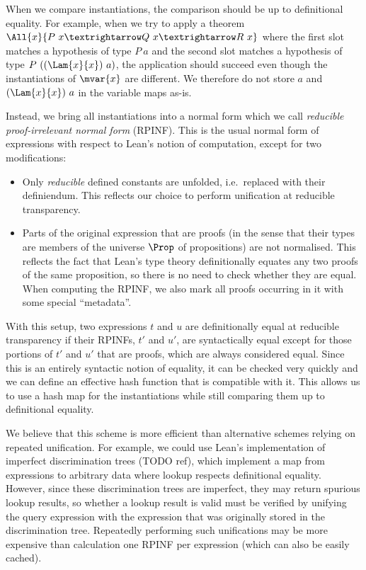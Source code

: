 \documentclass[runningheads]{llncs}
\begin{document}
When we compare instantiations, the comparison should be up to definitional equality.
For example, when we try to apply a theorem $\All{x}{P~x → Q~x → R~x}$ where the first slot matches a hypothesis of type $P~a$ and the second slot matches a hypothesis of type $P~((\Lam{x}{x})~a)$, the application should succeed even though the instantiations of $\mvar{x}$ are different.
We therefore do not store $a$ and $(\Lam{x}{x})~a$ in the variable maps as-is.

Instead, we bring all instantiations into a normal form which we call \emph{reducible proof-irrelevant normal form} (RPINF).
This is the usual normal form of expressions with respect to Lean's notion of computation, except for two modifications:
\begin{itemize}
  \item Only \emph{reducible} defined constants are unfolded, i.e.\ replaced with their definiendum.
        This reflects our choice to perform unification at reducible transparency.
  \item Parts of the original expression that are proofs (in the sense that their types are members of the universe $\Prop$ of propositions) are not normalised.
        This reflects the fact that Lean's type theory definitionally equates any two proofs of the same proposition, so there is no need to check whether they are equal.
        When computing the RPINF, we also mark all proofs occurring in it with some special \enquote{metadata}.
\end{itemize}

With this setup, two expressions $t$ and $u$ are definitionally equal at reducible transparency if their RPINFs, $t'$ and $u'$, are syntactically equal except for those portions of $t'$ and $u'$ that are proofs, which are always considered equal.
Since this is an entirely syntactic notion of equality, it can be checked very quickly and we can define an effective hash function that is compatible with it.
This allows us to use a hash map for the instantiations while still comparing them up to definitional equality.

We believe that this scheme is more efficient than alternative schemes relying on repeated unification.
For example, we could use Lean's implementation of imperfect discrimination trees (TODO ref), which implement a map from expressions to arbitrary data where lookup respects definitional equality.
However, since these discrimination trees are imperfect, they may return spurious lookup results, so whether a lookup result is valid must be verified by unifying the query expression with the expression that was originally stored in the discrimination tree.
Repeatedly performing such unifications may be more expensive than calculation one RPINF per expression (which can also be easily cached).
\end{document}
